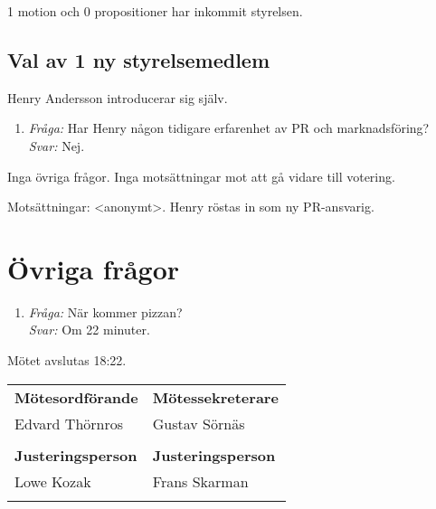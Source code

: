 \documentclass[a4paper]{article}
\begin{document}
1 motion och 0 propositioner har inkommit styrelsen.

\subsection{Val av 1 ny styrelsemedlem}

Henry Andersson introducerar sig själv.

\begin{enumerate}
\def\labelenumi{\arabic{enumi}.}
\item \emph{Fråga:} Har Henry någon tidigare erfarenhet av PR och marknadsföring? \\
    \emph{Svar:} Nej.
\end{enumerate}

Inga övriga frågor. Inga motsättningar mot att gå vidare till votering.

Motsättningar: <anonymt>. Henry röstas in som ny PR-ansvarig.

\section{Övriga frågor}

\begin{enumerate}
\def\labelenumi{\arabic{enumi}.}
\item \emph{Fråga:} När kommer pizzan? \\
    \emph{Svar:} Om 22 minuter.
\end{enumerate}

Mötet avslutas 18:22.

\vspace{2em}

\begin{tabular}{@{}p{}p{}@{}}
  \textbf{Mötesordförande} & \textbf{Mötessekreterare} \\[0.3em]
  Edvard Thörnros & Gustav Sörnäs \\
  \vspace{8em} &\\
  \textbf{Justeringsperson} & \textbf{Justeringsperson} \\[0.3em]
  Lowe Kozak & Frans Skarman \\
  \vspace{8em} &\\
\end{tabular}
\end{document}
